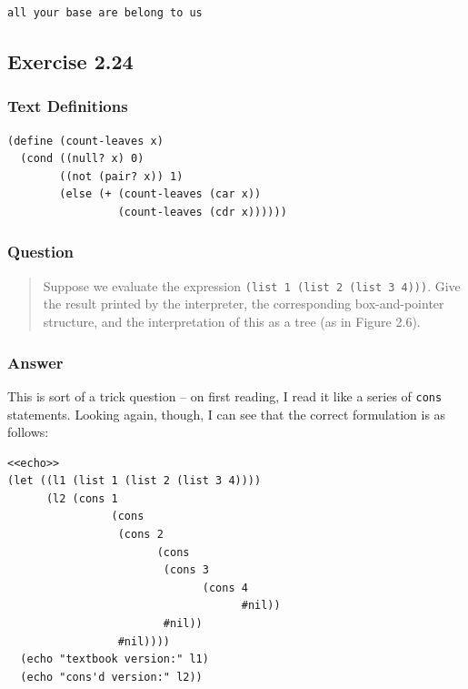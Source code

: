 \documentclass[final,fleqn,titlepage,twoside]{article}
\begin{document}
\begin{verbatim}
all your base are belong to us 
\end{verbatim}

\subsection{Exercise 2.24}
\label{sec:orgdbde60a}
\subsubsection{Text Definitions}
\label{sec:orgda05f87}
\begin{verbatim}
(define (count-leaves x)
  (cond ((null? x) 0)
        ((not (pair? x)) 1)
        (else (+ (count-leaves (car x))
                 (count-leaves (cdr x))))))
\end{verbatim}

\subsubsection{Question}
\label{sec:orge2a7f73}
\begin{quote}
Suppose we evaluate the expression \texttt{(list 1 (list 2 (list 3 4)))}.
Give the result printed by the interpreter, the corresponding box-and-pointer
structure, and the interpretation of this as a tree (as in Figure 2.6).
\end{quote}

\subsubsection{Answer}
\label{sec:orgab164a4}
This is sort of a trick question -- on first reading, I read it like a series of
\texttt{cons} statements. Looking again, though, I can see that the correct
formulation is as follows:
\begin{verbatim}
<<echo>>
(let ((l1 (list 1 (list 2 (list 3 4))))
      (l2 (cons 1
                (cons
                 (cons 2
                       (cons
                        (cons 3
                              (cons 4
                                    #nil))
                        #nil))
                 #nil))))
  (echo "textbook version:" l1)
  (echo "cons'd version:" l2))
\end{verbatim}
\end{document}
